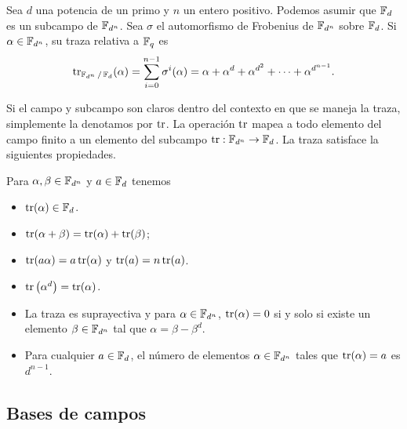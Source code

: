 \begin{definition}
  Sea $d$ una potencia de un primo y $n$ un entero positivo.
  Podemos asumir que $\operatorname{\mathbb{F}}_d$ es un subcampo de $\operatorname{\mathbb{F}}_{d^{n}}$.
  Sea $\sigma$ el automorfismo de Frobenius de $\operatorname{\mathbb{F}}_{d^{n}}$ 
  sobre $\operatorname{\mathbb{F}}_d$. Si $\alpha \in \operatorname{\mathbb{F}}_{d^{n}}$, su traza
  relativa a $\operatorname{\mathbb{F}}_q$ es
  \begin{equation}
    \operatorname{tr}_{\operatorname{\mathbb{F}}_{d^{n}} / \operatorname{\mathbb{F}}_d}(\alpha)
    = \sum_{i = 0}^{n-1} \sigma^{i}(\alpha)
    = \alpha + \alpha^{d} + \alpha^{d^2} + \cdots +
    \alpha^{d^{n-1}}.
  \end{equation}
\end{definition}
Si el campo y subcampo son claros dentro del contexto en que
se maneja la traza, simplemente la denotamos por $\operatorname{tr}$. La
operación $\operatorname{tr}$ mapea a todo elemento del campo finito a un
elemento del subcampo $\operatorname{tr} : \operatorname{\mathbb{F}}_{d^{n}} \to \operatorname{\mathbb{F}}_d$. La traza
satisface la siguientes propiedades.
\begin{theorem}
  Para $\alpha,\beta \in \operatorname{\mathbb{F}}_{d^{n}}$ y $a \in \operatorname{\mathbb{F}}_d$ tenemos
  \begin{itemize}
    \item $\operatorname{tr}(\alpha) \in \operatorname{\mathbb{F}}_d$.
    \item $\operatorname{tr}(\alpha+\beta) = \operatorname{tr}(\alpha) + \operatorname{tr}(\beta)$;
    \item $\operatorname{tr}(a\alpha) = a \operatorname{tr}(\alpha)$ y $\operatorname{tr}(a) = n
      \operatorname{tr}(a)$.
    \item $\operatorname{tr}\left( \alpha^{d} \right) = \operatorname{tr}(\alpha)$.
    \item La traza es suprayectiva y para $\alpha \in
      \operatorname{\mathbb{F}}_{d^{n}}$, $\operatorname{tr}(\alpha) = 0$ si y solo si existe un
      elemento $\beta \in \operatorname{\mathbb{F}}_{d^{n}}$ tal que $\alpha =
      \beta - \beta^{d}$.
    \item Para cualquier $a \in \operatorname{\mathbb{F}}_d$, el número de
      elementos $\alpha \in \operatorname{\mathbb{F}}_{d^{n}}$ tales que
      $\operatorname{tr}(\alpha) = a$ es $d^{n-1}$.
  \end{itemize}
\end{theorem}

\subsection{Bases de campos}

